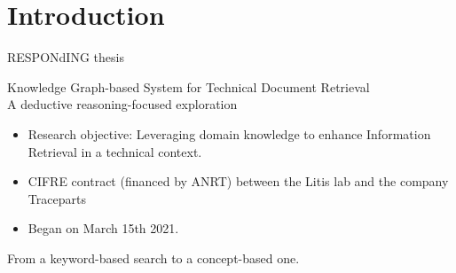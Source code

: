\section{Introduction}

\begin{frame}{RESPONdING thesis}
    \begin{center}
        Knowledge Graph-based System for Technical Document Retrieval\\A deductive reasoning-focused exploration
    \end{center}
    
    \begin{itemize}
        \item Research objective: Leveraging domain knowledge to enhance Information Retrieval in a technical context.
        \item CIFRE contract (financed by ANRT) between the Litis lab and the company Traceparts 
        \item Began on March 15th 2021.
    \end{itemize}
    
    \begin{center}
        From a keyword-based search to a concept-based one.
    \end{center}
    
\end{frame}

